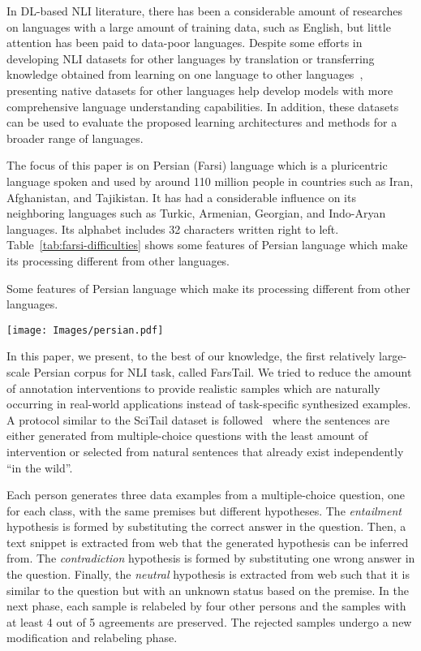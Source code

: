 \documentclass[preprint,12pt]{elsarticle}
\begin{document}
In DL-based NLI literature, there has been a considerable amount of researches on languages with a large amount of training data, such as English, but little attention has been paid to data-poor languages. Despite some efforts in developing NLI datasets for other languages by translation or transferring knowledge obtained from learning on one language to other languages~\citep{conneau2018xnli}, presenting native datasets for other languages help develop models with more comprehensive language understanding capabilities. In addition, these datasets can be used to evaluate the proposed learning architectures and methods for a broader range of languages. 

The focus of this paper is on Persian (Farsi) language which is a pluricentric language spoken and used by around 110 million people in countries such as Iran, Afghanistan, and Tajikistan. It has had a considerable influence on its neighboring languages such as Turkic, Armenian, Georgian, and Indo-Aryan languages. Its alphabet includes 32 characters written right to left. Table~\ref{tab:farsi-difficulties} shows some features of Persian language which make its processing different from other languages.

\begin{table}[!t]
\caption{Some features of Persian language which make its processing different from other languages.}
    \label{tab:farsi-difficulties}
    \centering
    \texttt{[image: Images/persian.pdf]}


\end{table}

In this paper, we present, to the best of our knowledge, the first relatively large-scale Persian corpus for NLI task, called FarsTail. We tried to reduce the amount of annotation interventions to provide realistic samples which are naturally occurring in real-world applications instead of task-specific synthesized examples. A protocol similar to the SciTail dataset is followed~\citep{khot2018scitail} where the sentences are either generated from multiple-choice questions with the least amount of intervention or selected from natural sentences that already exist independently “in the wild”. 



Each person generates three data examples from a multiple-choice question, one for each class, with the same premises but different hypotheses. The \textit{entailment} hypothesis is formed by substituting the correct answer in the question. Then, a text snippet is extracted from web that the generated hypothesis can be inferred from. The \textit{contradiction} hypothesis is formed by substituting one wrong answer in the question. Finally, the \textit{neutral} hypothesis is extracted from web such that it is similar to the question but with an unknown status based on the premise. In the next phase, each sample is relabeled by four other persons and the samples with at least 4 out of 5 agreements are preserved. The rejected samples undergo a new modification and relabeling phase. 
\end{document}
